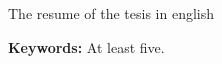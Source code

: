 \chapter*{\runtitle}

\noindent The resume of the tesis in english

\bigskip

\noindent\textbf{Keywords:} At least five.